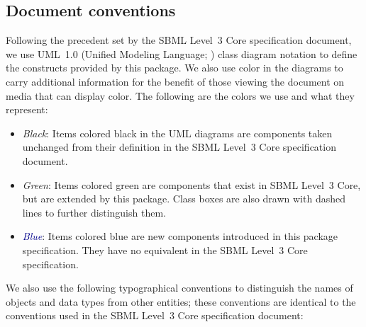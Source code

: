 
\subsection{Document conventions}
\label{conventions}

Following the precedent set by the SBML Level~3 Core specification
document, we use UML~1.0 (Unified Modeling Language;
\citealt{eriksson:1998,oestereich:1999}) class diagram notation to
define the constructs provided by this package.  We also use color in
the diagrams to carry additional information for the benefit of those
viewing the document on media that can display color.  The following are
the colors we use and what they represent:

\begin{itemize}

\item[\raisebox{2.75pt}{\colorbox{black}{\rule{0.8pt}{0.8pt}}}]
  \emph{Black}: Items colored black in the UML diagrams are components
  taken unchanged from their definition in the SBML Level~3 Core
  specification document.

\item[\raisebox{2.75pt}{\colorbox{mediumgreen}{\rule{0.8pt}{0.8pt}}}]
  \emph{\textcolor{mediumgreen}{Green}}: Items colored green are
  components that exist in SBML Level~3 Core, but are extended by this
  package.  Class boxes are also drawn with dashed lines to further
  distinguish them.

\item[\raisebox{2.75pt}{\colorbox{darkblue}{\rule{0.8pt}{0.8pt}}}]
  \emph{\textcolor{darkblue}{Blue}}: Items colored blue are new
  components introduced in this package specification.  They have no
  equivalent in the SBML Level~3 Core specification.

\end{itemize}

We also use the following typographical conventions to distinguish the
names of objects and data types from other entities; these conventions
are identical to the conventions used in the SBML Level~3 Core specification
document:


